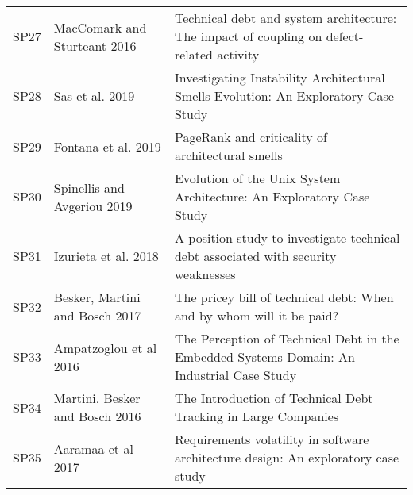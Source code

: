 \begin{tabular}{lll}
 SP27 &                                             MacComark and Sturteant 2016 &                                                                                 Technical debt and system architecture: The impact of coupling on defect-related activity \\
 SP28 &                                                          Sas et al. 2019 &                                                                                       Investigating Instability Architectural Smells Evolution: An Exploratory Case Study \\
 SP29 &                                                      Fontana et al. 2019 &                                                                                                                          PageRank and criticality of architectural smells \\
 SP30 &                                              Spinellis and Avgeriou 2019 &                                                                                                      Evolution of the Unix System Architecture: An Exploratory Case Study \\
 SP31 &                                                     Izurieta et al. 2018 &                                                                                        A position study to investigate technical debt associated with security weaknesses \\
 SP32 &                                           Besker, Martini and Bosch 2017 &                                                                                                      The pricey bill of technical debt: When and by whom will it be paid? \\
 SP33 &                                                   Ampatzoglou et al 2016 &                                                                                 The Perception of Technical Debt in the Embedded Systems Domain: An Industrial Case Study \\
 SP34 &                                           Martini, Besker and Bosch 2016 &                                                                                                            The Introduction of Technical Debt Tracking in Large Companies \\
 SP35 &                                                       Aaramaa et al 2017 &                                                                                        Requirements volatility in software architecture design: An exploratory case study \\

\end{tabular}
